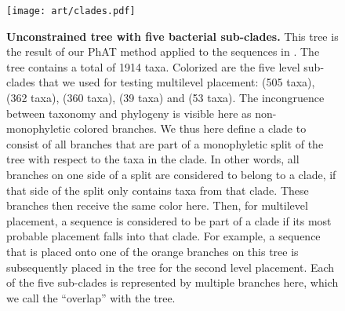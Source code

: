 \begin{figure}[hpbt]
    \centering
    \texttt{[image: art/clades.pdf]}
    \caption[Unconstrained  tree with five bacterial sub-clades]{
        \textbf{Unconstrained  tree with five bacterial sub-clades.}
        This tree is the result of our \ac{PhAT} method
        applied to the  sequences in .
        The tree contains a total of 1914 taxa.
        Colorized are the five  level sub-clades that we used for testing multilevel placement:
         (505 taxa),  (362 taxa),  (360 taxa),
         (39 taxa) and  (53 taxa).
        The incongruence between taxonomy and phylogeny is visible here as non-monophyletic colored branches.
        We thus here define a clade to consist of all branches
        that are part of a monophyletic split of the tree with respect to the taxa in the clade.
        In other words, all branches on one side of a split are considered to belong to a clade, %
        if that side of the split only contains taxa from that clade.
        These branches then receive the same color here.
        Then, for multilevel placement, a sequence is considered to be part of a clade
        if its most probable placement falls into that clade.
        For example, a sequence that is placed onto one of the orange branches on this tree
        is subsequently placed in the  tree for the second level placement.
        Each of the five sub-clades is represented by multiple branches here,
        which we call the ``overlap'' with the  tree.
    }
    \label{fig:clades}
\end{figure}



